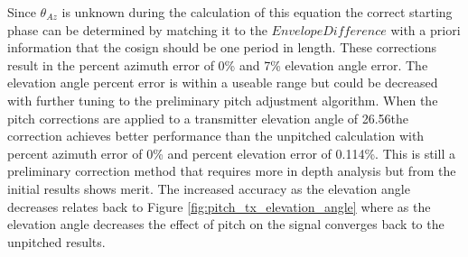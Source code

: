 Since $\theta_{Az}$ is unknown during the calculation of this equation the correct starting phase can be determined by matching it to the $EnvelopeDifference$ with a priori information that the cosign should be one period in length. These corrections result in the percent azimuth error of 0\% and 7\% elevation angle error. The elevation angle percent error is within a useable range but could be decreased with further tuning to the preliminary pitch adjustment algorithm. When the pitch corrections are applied to a transmitter elevation angle of 26.56\textdegree \space the correction achieves better performance than the unpitched calculation with percent azimuth error of 0\% and percent elevation error of 0.114\%. This is still a preliminary correction method that requires more in depth analysis but from the initial results shows merit. The increased accuracy as the elevation angle decreases relates back to Figure \ref{fig:pitch_tx_elevation_angle} where as the elevation angle decreases the effect of pitch on the signal converges back to the unpitched results.



